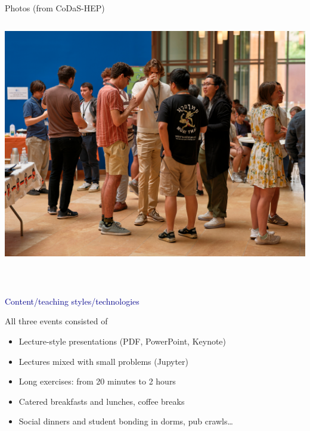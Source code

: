 \documentclass[aspectratio=169]{beamer}
\begin{document}
\begin{frame}{Photos (from CoDaS-HEP)}
\begin{columns}
\includegraphics[width=\linewidth]{PHOTOS/DSCF2642.jpg}
\end{columns}
\end{frame}

\begin{frame}{\mbox{ }}
\LARGE
\begin{center}
\textcolor{darkblue}{Content/teaching styles/technologies}
\end{center}
\end{frame}

\begin{frame}{All three events consisted of}
\Large
\vspace{0.5 cm}
\begin{itemize}\setlength{\itemsep}{0.25 cm}
\item<1-> Lecture-style presentations (PDF, PowerPoint, Keynote)
\item<2-> Lectures mixed with small problems (Jupyter)
\item<3-> Long exercises: from 20 minutes to 2 hours
\item<4-> Catered breakfasts and lunches, coffee breaks
\item<5-> Social dinners and student bonding in dorms, pub crawls\ldots
\end{itemize}

\vspace{0.5 cm}
\large
{}

\vspace{0.25 cm}
\end{frame}
\end{document}
